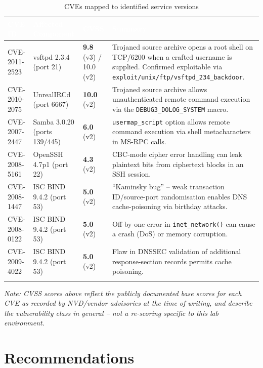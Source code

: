 \documentclass[11pt,a4paper]{article}
\begin{document}
\begin{longtable}{p{2.6cm} p{4.3cm} p{1.5cm} p{8cm}}
\toprule
\rowcolor{navy}
\textcolor{white}{\textbf{CVE ID}} & \textcolor{white}{\textbf{Affected Component}} & \textcolor{white}{\textbf{CVSS}} & \textcolor{white}{\textbf{Summary}} \\
\midrule
\endhead
CVE-2011-2523 & vsftpd 2.3.4 (port 21) & \textbf{9.8} (v3) / 10.0 (v2) & Trojaned source archive opens a root shell on TCP/6200 when a crafted username is supplied. Confirmed exploitable via \texttt{exploit/unix/ftp/vsftpd\_234\_backdoor}. \\
CVE-2010-2075 & UnrealIRCd (port 6667) & \textbf{10.0} (v2) & Trojaned source archive allows unauthenticated remote command execution via the \texttt{DEBUG3\_DOLOG\_SYSTEM} macro. \\
CVE-2007-2447 & Samba 3.0.20 (ports 139/445) & \textbf{6.0} (v2) & \texttt{usermap\_script} option allows remote command execution via shell metacharacters in MS-RPC calls. \\
CVE-2008-5161 & OpenSSH 4.7p1 (port 22) & \textbf{4.3} (v2) & CBC-mode cipher error handling can leak plaintext bits from ciphertext blocks in an SSH session. \\
CVE-2008-1447 & ISC BIND 9.4.2 (port 53) & \textbf{5.0} (v2) & ``Kaminsky bug'' -- weak transaction ID/source-port randomisation enables DNS cache-poisoning via birthday attacks. \\
CVE-2008-0122 & ISC BIND 9.4.2 (port 53) & \textbf{5.0} (v2) & Off-by-one error in \texttt{inet\_network()} can cause a crash (DoS) or memory corruption. \\
CVE-2009-4022 & ISC BIND 9.4.2 (port 53) & \textbf{5.0} (v2) & Flaw in DNSSEC validation of additional response-section records permits cache poisoning. \\
\bottomrule
\caption{CVEs mapped to identified service versions}
\end{longtable}

\begin{panel}
\small\textit{Note: CVSS scores above reflect the publicly documented base scores for each CVE as recorded by NVD/vendor advisories at the time of writing, and describe the vulnerability class in general -- not a re-scoring specific to this lab environment.}
\end{panel}

\section{Recommendations}
\end{document}
